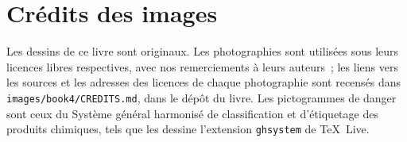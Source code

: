 \chapter*{Crédits des images}

Les dessins de ce livre sont originaux. Les photographies sont utilisées
sous leurs licences libres respectives, avec nos remerciements à leurs
auteurs~; les liens vers les sources et les adresses des licences de
chaque photographie sont recensés dans
\texttt{images/book4/CREDITS.md}, dans le dépôt du livre.
Les pictogrammes de danger sont ceux du Système général harmonisé de
classification et d'étiquetage des produits chimiques, tels que les
dessine l'extension \texttt{ghsystem} de \TeX\ Live.

